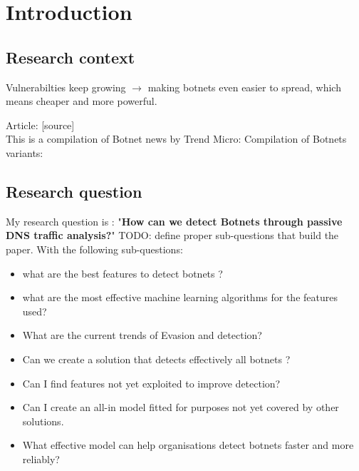 
\chapter{Introduction} %

\label{Introduction} %


\newcommand{\keyword}[1]{\textbf{#1}}
\newcommand{\tabhead}[1]{\textbf{#1}}
\newcommand{\code}[1]{\texttt{#1}}
\newcommand{\file}[1]{\texttt{\bfseries#1}}
\newcommand{\option}[1]{\texttt{\itshape#1}}

\section{Research context}
Vulnerabilties keep growing $\rightarrow$ making botnets even easier to spread, which means cheaper and more powerful.\cite{article1}

Article: \cite{trends1}
[source]\\
\cite{CRC_Botnets}
\cite{Botnet-def}
\cite{trends2}
\cite{cyberthreat}
\cite{iot}
\cite{botnet-families}
This is a compilation of Botnet news by Trend Micro: \cite{trends3}
Compilation of Botnets variants: \cite{variants}
\cite{mirai}
\section{Research question}
My research question is : "\textbf{How can we detect Botnets through passive DNS traffic analysis?}"
TODO: define proper sub-questions that build the paper.
With the following sub-questions:
\begin{itemize}
\item what are the best features to detect botnets ?
\item what are the most effective machine learning algorithms for the features used?
\item What are the current trends of Evasion and detection?
\item Can we create a solution that detects effectively all botnets ?
\item Can I find features not yet exploited to improve detection?
\item Can I create an all-in model fitted for purposes not yet covered by other solutions.
\item What effective model can help organisations detect botnets faster and more reliably?
\end{itemize}
